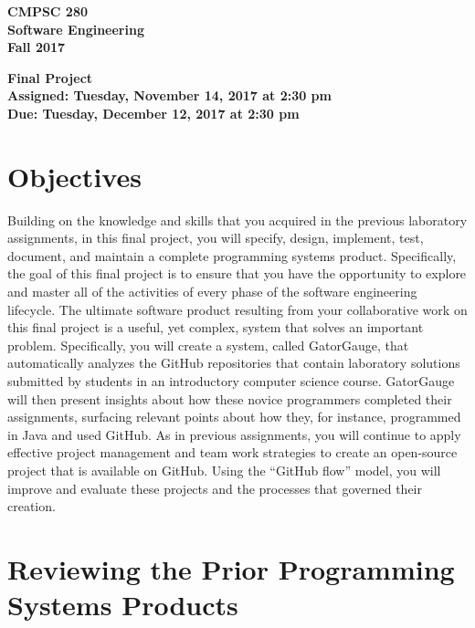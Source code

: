 \documentclass[11pt]{article}
\newcommand{\assignmentduedate}{December 12}
\newcommand{\assignmentassignedate}{November 14}
\newcommand{\labyear}{2017}
\newcommand{\labday}{Tuesday}
\newcommand{\labtime}{2:30 pm}
\newcommand{\assigneddate}{Assigned: \labday, \assignmentassignedate, \labyear{} at \labtime{}}
\newcommand{\duedate}{Due: \labday, \assignmentduedate, \labyear{} at \labtime{}}
\newcommand{\labtitle}[1]
{
  \begin{center}
    \begin{center}
      \bf
      CMPSC 280\\Software Engineering\\
      Fall 2017\\
      \medskip
    \end{center}
    \bf
    #1
  \end{center}
}
\begin{document}
\thispagestyle{empty}

\labtitle{Final Project \\ \assigneddate{} \\ \duedate{}}

\section*{Objectives}


Building on the knowledge and skills that you acquired in the previous laboratory assignments, in this final project,
you will specify, design, implement, test, document, and maintain a complete programming systems product. Specifically,
the goal of this final project is to ensure that you have the opportunity to explore and master all of the activities of
every phase of the software engineering lifecycle. The ultimate software product resulting from your collaborative work
on this final project is a useful, yet complex, system that solves an important problem. Specifically, you will create a
system, called GatorGauge, that automatically analyzes the GitHub repositories that contain laboratory solutions
submitted by students in an introductory computer science course. GatorGauge will then present insights about how these
novice programmers completed their assignments, surfacing relevant points about how they, for instance, programmed in
Java and used GitHub. As in previous assignments, you will continue to apply effective project management and team work
strategies to create an open-source project that is available on GitHub. Using the ``GitHub flow'' model, you will
improve and evaluate these projects and the processes that governed their creation.

\section*{Reviewing the Prior Programming Systems Products}
\end{document}
